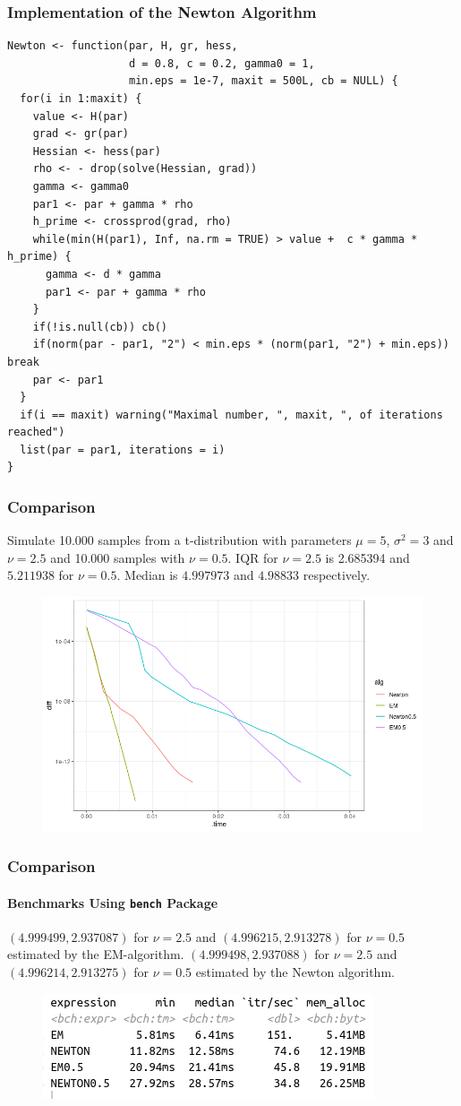 \documentclass[aspectratio=169]{beamer}
\begin{document}
\begin{frame}[fragile]
    \frametitle{Implementation of the Newton Algorithm}
\begin{verbatim}
Newton <- function(par, H, gr, hess,
                   d = 0.8, c = 0.2, gamma0 = 1, 
                   min.eps = 1e-7, maxit = 500L, cb = NULL) {
  for(i in 1:maxit) {
    value <- H(par)
    grad <- gr(par)
    Hessian <- hess(par) 
    rho <- - drop(solve(Hessian, grad)) 
    gamma <- gamma0
    par1 <- par + gamma * rho
    h_prime <- crossprod(grad, rho)
    while(min(H(par1), Inf, na.rm = TRUE) > value +  c * gamma * h_prime) { 
      gamma <- d * gamma 
      par1 <- par + gamma * rho
    }
    if(!is.null(cb)) cb()
    if(norm(par - par1, "2") < min.eps * (norm(par1, "2") + min.eps)) break 
    par <- par1 
  }
  if(i == maxit) warning("Maximal number, ", maxit, ", of iterations reached")
  list(par = par1, iterations = i)
}
\end{verbatim}
\end{frame}
\begin{frame}
    \frametitle{Comparison}
    Simulate 10.000 samples from a t-distribution with parameters $\mu = 5$, $\sigma^{2}=3$ and $\nu = 2.5$ and 10.000 samples with $\nu = 0.5$. IQR for $\nu = 2.5$ is 2.685394 and $5.211938$ for $\nu = 0.5$. Median is $4.997973$ and $4.98833$ respectively.
    \begin{figure}
        \centering
        \includegraphics[scale = 0.4]{figure/R_NewtonVsEm.png}
    \end{figure}
\end{frame}
\begin{frame}
    \frametitle{Comparison}    
    \framesubtitle{Benchmarks Using \texttt{bench} Package}
    $(4.999499, 2.937087)$ for $\nu = 2.5$ and $(4.996215, 2.913278)$ for $\nu=0.5$ estimated by the EM-algorithm. $(4.999498, 2.937088)$ for $\nu = 2.5$ and $(4.996214, 2.913275)$ for $\nu = 0.5$ estimated by the Newton algorithm.
    \begin{figure}
        \centering
        \includegraphics[scale = 0.6]{figure/R_NewtonVsEm_table.png}
    \end{figure}
\end{frame}
\end{document}

